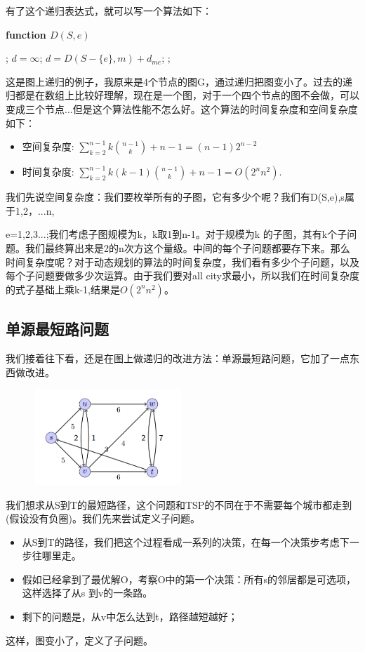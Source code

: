 有了这个递归表达式，就可以写一个算法如下：

\bf function $D(S, e)$
\begin{algorithmic}[1]
	;	
\ENDIF	
\STATE $d = \infty$;
		\STATE $d = D( S - \{e\}, m) + d_{me}$;
	\ENDIF
\ENDFOR
{};
\end{algorithmic}


 这是图上递归的例子，我原来是4个节点的图G，通过递归把图变小了。过去的递归都是在数组上比较好理解，现在是一个图，对于一个四个节点的图不会做，可以变成三个节点...但是这个算法性能不怎么好。这个算法的时间复杂度和空间复杂度如下：
\begin{itemize}
	\item 空间复杂度:  $\sum_{k=2}^{n-1}  k {n-1 \choose k} + n-1= (n-1) 2^{n-2}$
	\item 时间复杂度:  $\sum_{k=2}^{n-1} k(k-1){n-1 \choose k} + n-1 = O( 2^n n^2)$.
\end{itemize}

我们先说空间复杂度：我们要枚举所有的子图，它有多少个呢？我们有D(S,e),s属于{1,2，$...$n},

e=1,2,3$...$;我们考虑子图规模为k，k取1到n-1。对于规模为k 的子图，其有k个子问题。我们最终算出来是2的n次方这个量级。中间的每个子问题都要存下来。那么时间复杂度呢？对于动态规划的算法的时间复杂度，我们看有多少个子问题，以及每个子问题要做多少次运算。由于我们要对all city求最小，所以我们在时间复杂度的式子基础上乘k-1,结果是$O( 2^n n^2)$。

\subsection{单源最短路问题}
我们接着往下看，还是在图上做递归的改进方法：单源最短路问题，它加了一点东西做改进。

\begin{figure}[H]
\centering
\includegraphics[width=2.2in]{sp.png}
\end{figure}

我们想求从S到T的最短路径，这个问题和TSP的不同在于不需要每个城市都走到(假设没有负圈)。我们先来尝试定义子问题。
\begin{itemize}
    \item 从S到T的路径，我们把这个过程看成一系列的决策，在每一个决策步考虑下一步往哪里走。
    \item 假如已经拿到了最优解O，考察O中的第一个决策：所有s的邻居都是可选项，这样选择了从s 到v的一条路。
    \item 剩下的问题是，从v中怎么达到t，路径越短越好；
\end{itemize}
这样，图变小了，定义了子问题。


